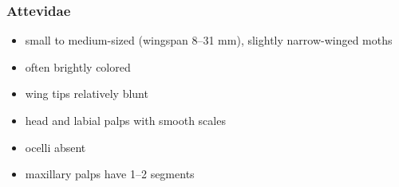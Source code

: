 \documentclass[letterpaper, 11pt]{article}
\begin{document}
\subsubsection{Attevidae}
\begin{itemize}
\item small to medium-sized (wingspan 8--31 mm), slightly narrow-winged moths
\item often brightly colored 
\item wing tips relatively blunt
\item head and labial palps with smooth scales
\item ocelli absent
\item maxillary palps have 1--2 segments
\end{itemize}
\end{document}
